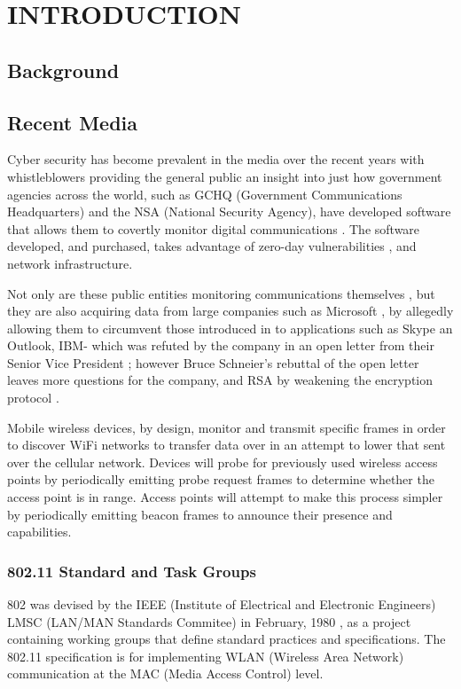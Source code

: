 \section {INTRODUCTION}
\subsection{Background}
\subsection*{Recent Media}
Cyber security has become prevalent in the media over the recent years with whistleblowers \cite{intro:guardian_snowden} providing the general public an insight into just how government agencies across the world, such as GCHQ \cite{intro:gchq_home} (Government Communications Headquarters) and the NSA \cite{intro:nsa_home} (National Security Agency), have developed software \cite{intro:schneier_nsa_1}\cite{intro:schneier_nsa_3} that allows them to covertly monitor digital communications \cite{intro:schneier_nsa_4}. The software developed, and purchased, takes advantage of zero-day vulnerabilities \cite{intro:nsa_invoice}, and network infrastructure.

Not only are these public entities monitoring communications themselves \cite{intro:schneier_nsa_2}, but they are also acquiring data from large companies such as Microsoft \cite{intro:guardian_ms_nsa}, by allegedly allowing them to circumvent those introduced in to applications such as Skype an Outlook, IBM- which was refuted by the company in an open letter from their Senior Vice President \cite{intro:ibm_open_letter}; however Bruce Schneier’s rebuttal \cite{intro:open_open_letter} of the open letter leaves more questions for the company, and RSA by  weakening the encryption protocol \cite{intro:bristol_open_letter}.

Mobile wireless devices, by design, monitor and transmit specific frames in order to discover WiFi networks to transfer data over in an attempt to lower that sent over the cellular network. Devices will probe for previously used wireless access points by periodically emitting probe request frames to determine whether the access point is in range. Access points will attempt to make this process simpler by periodically emitting beacon frames to announce their presence and capabilities.

\clearpage
\subsubsection{802.11 Standard and Task Groups}
802 was devised by the IEEE (Institute of Electrical and Electronic Engineers) LMSC (LAN/MAN Standards Commitee) in February, 1980 \cite{intro:ieee_decrypted}, as a project containing working groups that define standard practices and specifications. The 802.11 specification is for implementing WLAN (Wireless Area Network) communication at the MAC (Media Access Control) level. 

